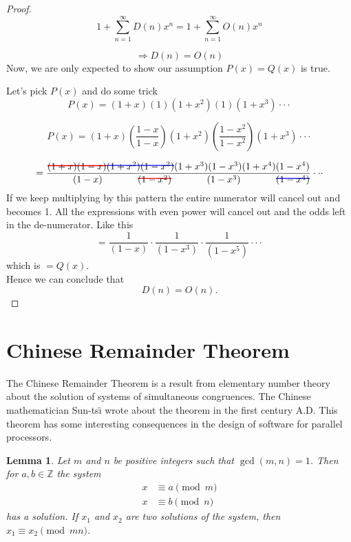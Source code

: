 \documentclass[12pt]{article}
\newcommand\hcancel[2][black]{\setbox0=\hbox{$#2$}%
\rlap{\raisebox{.45\ht0}{\textcolor{#1}{\rule{\wd0}{1pt}}}}#2}
\newtheorem{lem}[thm]{Lemma}
\begin{document}
\begin{proof}
$$1+\sum_{n=1}^\infty D(n) x^n =1+\sum_{n=1}^\infty O(n)x^n$$

$$\Rightarrow D(n) =O(n)$$
Now, we are only expected to show our assumption $P(x)=Q(x)$ is true.

Let's pick $P(x)$ and do some trick
$$P(x)=(1+x)(1)(1+x^2)(1)(1+x^3)\cdot\cdot\cdot$$

$$P(x)=(1+x)(\frac{1-x}{1-x})(1+x^2)(\frac{1-x^2}{1-x^2})(1+x^3)\cdot\cdot\cdot$$

$$ =\frac{\hcancel[red]{(1+x)(1-x)}\hcancel[blue]{(1+x^2)(1-x^2)}(1+x^3)(1-x^3)(1+x^4)(1-x^4)}{~~~~~~~~(1-x)~~~~~~~~~~~\hcancel[red]{(1-x^2)}~~~~~~~~~~~(1-x^3)~~~~~~~~~~~\hcancel[blue]{(1-x^4)}}\cdot\cdot\cdot
$$
If we keep multiplying by this pattern the entire numerator will cancel out and becomes 1. All the expressions with even power will cancel out and the odds left in the de-numerator.
Like this
$$
=\frac{1}{(1-x)}\cdot\frac{1}{(1-x^3)}\cdot \frac{1}{(1-x^5)}\cdot\cdot\cdot
$$
which is $=Q(x)$.\\
Hence we can conclude that
$$D (n) = O (n).$$
\end{proof}

\section{Chinese Remainder Theorem}


The Chinese Remainder Theorem is a result from elementary number
theory about the solution of systems of simultaneous congruences. The
Chinese mathematician Sun-ts\"{\i} wrote about the theorem in the
first century A.D. This theorem has some interesting
consequences in the design of software for parallel processors.


\begin{lem}\label{rings:chinese_remainder_lemma}
Let $m$ and $n$ be positive integers such that $\gcd( m, n) = 1$. Then
for $a, b \in {\mathbb Z}$ the system
\begin{align*}
x & \equiv  a \pmod{m} \\
x & \equiv  b \pmod{n}
\end{align*}
has a solution.  If $x_1$ and $x_2$ are two solutions of the system,
then  $x_1 \equiv x_2 \pmod{mn}$.
\end{lem}
\end{document}
